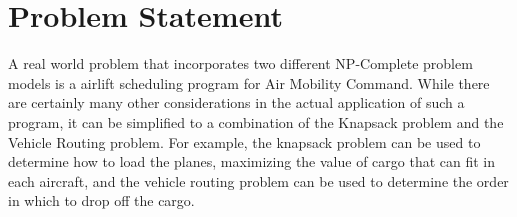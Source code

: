 \documentclass[journal]{IEEEtran}
\begin{document}
%






\section{Problem Statement}
\tab A real world problem that incorporates two different NP-Complete problem models is a airlift scheduling program for Air Mobility Command. While there are certainly many other considerations in the actual application of such a program, it can be simplified to a combination of the Knapsack problem and the Vehicle Routing problem. For example, the knapsack problem can be used to determine how to load the planes, maximizing the value of cargo that can fit in each aircraft, and the vehicle routing problem can be used to determine the order in which to drop off the cargo.\par
\end{document}
